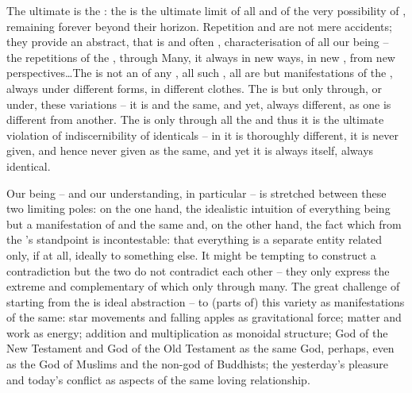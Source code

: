 \pa The ultimate  is the : the  is the ultimate
limit of all  and of the very possibility of
, remaining forever beyond their horizon. Repetition and 
 are not mere accidents; they provide an abstract,
that is  and often , characterisation of all
our being --  the {repetitions} of the ,
  through Many,  it
always in new ways, in new , from new perspectives\ldots  The
 is not an  of any , all such
, all  are but manifestations of the
, always under different forms, in different 
clothes.  The  is  but only through, or under,
these variations -- it is  and the same, and yet,
 always different, as one  is
different from another.  The  is  only through
all the  and thus it is the ultimate violation of
indiscernibility of identicals -- in  it is
thoroughly different, it is never given, and hence never given as the same, and
yet it is always itself, always identical.


Our being -- and our understanding, in particular -- is stretched between
these two limiting poles: on the one hand, the idealistic intuition of
everything being but a manifestation of  and the same and, on the other
hand, the fact which from the 's standpoint is incontestable: that everything is a separate entity
related only, if at all, ideally to something else. It might be tempting to
construct a contradiction but the two do not contradict each other -- they only
express the extreme and complementary  of  which
 only through many.  The great challenge of 
starting from the  is ideal abstraction -- to
 (parts of) this variety as manifestations of the same: star
movements and falling apples as gravitational force; matter and work as energy;
addition and multiplication as monoidal structure; God of the New Testament and
God of the Old Testament as the same God, perhaps, even as the God of Muslims
and the non-god of Buddhists; the yesterday's pleasure and today's conflict as
aspects of the same loving relationship.


